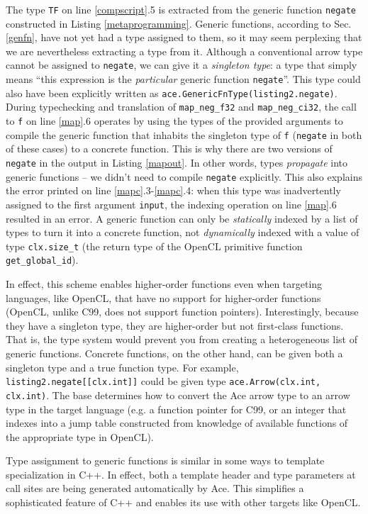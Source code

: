 \documentclass[9pt,preprint]{sigplanconf}
\begin{document}
The type \verb|TF| on line \ref{compscript}.5 is extracted from the generic function \verb|negate| constructed in Listing \ref{metaprogramming}. Generic functions, according to Sec. \ref{genfn}, have not yet had a type assigned to them, so it may seem perplexing that we are nevertheless extracting a type from it. Although a conventional arrow type cannot be assigned to \verb|negate|, we can give it a \emph{singleton type}: a type that simply means ``this expression is the \emph{particular} generic function \verb|negate|''. This type could also have been explicitly written as \verb|ace.GenericFnType(listing2.negate)|. During typechecking and translation of \verb|map_neg_f32| and \verb|map_neg_ci32|, the call to \verb|f| on line \ref{map}.6 operates by using the types of the provided arguments to compile the generic function that inhabits the singleton type of \verb|f| (\verb|negate| in both of these cases) to a concrete function. This is why there are two versions of \verb|negate| in the output in Listing \ref{mapout}. In other words, types \emph{propagate} into generic functions -- we didn't need to compile \verb|negate| explicitly. This also explains the error printed on line \ref{mapc}.3-\ref{mapc}.4: when this type was inadvertently assigned to the first argument \verb|input|, the indexing operation on line \ref{map}.6 resulted in an error. A generic function can only be \emph{statically} indexed by a list of types to turn it into a concrete function, not \emph{dynamically} indexed with a value of type \verb|clx.size_t| (the return type of the OpenCL primitive function \verb|get_global_id|).

In effect, this scheme enables higher-order functions even when targeting languages, like OpenCL, that have no support for higher-order functions (OpenCL, unlike C99, does not support function pointers). Interestingly, because they have a singleton type, they are higher-order but not first-class functions. That is, the type system would prevent you from creating a heterogeneous list of generic functions. Concrete functions, on the other hand, can be given both a singleton type and a true function type. For example, \verb|listing2.negate[[clx.int]]| could be given type \verb|ace.Arrow(clx.int, clx.int)|. The base determines how to convert the Ace arrow type to an arrow type in the target language (e.g. a function pointer for C99, or an integer that indexes into a jump table constructed from knowledge of available functions of the appropriate type in OpenCL).

Type assignment to generic functions is similar in some ways to template specialization in C++. In effect, both a template header and type parameters at call sites are being generated automatically by Ace. This simplifies a sophisticated feature of C++ and enables its use with other targets like OpenCL. %
\end{document}
